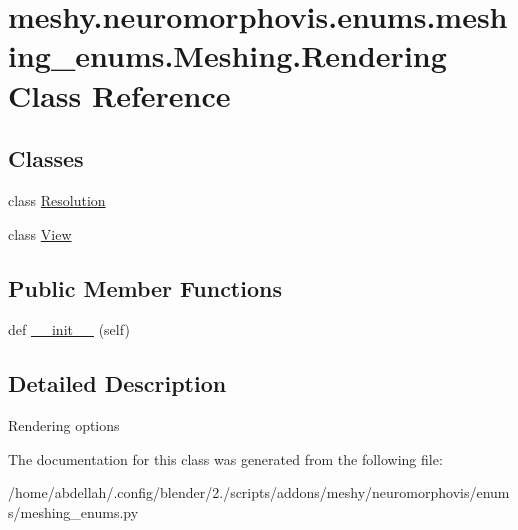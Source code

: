 \hypertarget{classmeshy_1_1neuromorphovis_1_1enums_1_1meshing__enums_1_1Meshing_1_1Rendering}{}\section{meshy.\+neuromorphovis.\+enums.\+meshing\+\_\+enums.\+Meshing.\+Rendering Class Reference}
\label{classmeshy_1_1neuromorphovis_1_1enums_1_1meshing__enums_1_1Meshing_1_1Rendering}


 


\subsection*{Classes}
\begin{DoxyCompactItemize}
\item 
class \hyperlink{classmeshy_1_1neuromorphovis_1_1enums_1_1meshing__enums_1_1Meshing_1_1Rendering_1_1Resolution}{Resolution}
\item 
class \hyperlink{classmeshy_1_1neuromorphovis_1_1enums_1_1meshing__enums_1_1Meshing_1_1Rendering_1_1View}{View}
\end{DoxyCompactItemize}
\subsection*{Public Member Functions}
\begin{DoxyCompactItemize}
\item 
def \hyperlink{classmeshy_1_1neuromorphovis_1_1enums_1_1meshing__enums_1_1Meshing_1_1Rendering_af5f419274573843b13d528aba6b8774a}{\+\_\+\+\_\+init\+\_\+\+\_\+} (self)\hypertarget{classmeshy_1_1neuromorphovis_1_1enums_1_1meshing__enums_1_1Meshing_1_1Rendering_af5f419274573843b13d528aba6b8774a}{}\label{classmeshy_1_1neuromorphovis_1_1enums_1_1meshing__enums_1_1Meshing_1_1Rendering_af5f419274573843b13d528aba6b8774a}

\end{DoxyCompactItemize}


\subsection{Detailed Description}


\begin{DoxyVerb}Rendering options
\end{DoxyVerb}
 

The documentation for this class was generated from the following file\+:\begin{DoxyCompactItemize}
\item 
/home/abdellah/.\+config/blender/2./scripts/addons/meshy/neuromorphovis/enums/meshing\+\_\+enums.\+py\end{DoxyCompactItemize}
